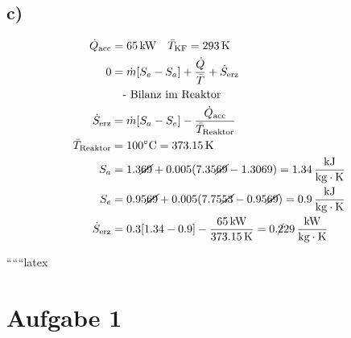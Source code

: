 

\subsection*{c)}

\begin{align*}
\dot{Q}_{\text{acc}} &= 65 \, \text{kW} \quad \bar{T}_{\text{KF}} = 293 \, \text{K} \\
0 &= \dot{m} [S_e - S_a] + \frac{\dot{Q}}{\bar{T}} + \dot{S}_{\text{erz}} \\
&\quad \text{- Bilanz im Reaktor} \\
\dot{S}_{\text{erz}} &= \dot{m} [S_a - S_e] - \frac{\dot{Q}_{\text{acc}}}{\bar{T}_{\text{Reaktor}}} \\
\bar{T}_{\text{Reaktor}} &= 100^\circ \text{C} = 373.15 \, \text{K} \\
S_a &= 1.3 \cancel{69} + 0.005 (7.35 \cancel{69} - 1.3069) = 1.34 \, \frac{\text{kJ}}{\text{kg} \cdot \text{K}} \\
S_e &= 0.95 \cancel{69} + 0.005 (7.75 \cancel{53} - 0.95 \cancel{69}) = 0.9 \, \frac{\text{kJ}}{\text{kg} \cdot \text{K}} \\
\dot{S}_{\text{erz}} &= 0.3 [1.34 - 0.9] - \frac{65 \, \text{kW}}{373.15 \, \text{K}} = 0. \cancel{2} 29 \, \frac{\text{kW}}{\text{kg} \cdot \text{K}}
\end{align*}

``````latex


\section*{Aufgabe 1}